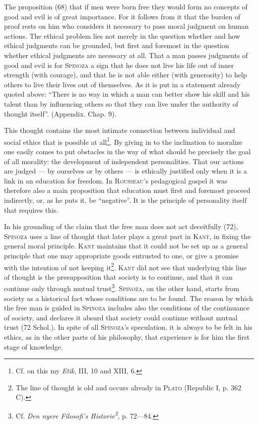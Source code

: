 \documentclass[12pt]{article}
\newcommand{\opage}[1]{\marginnote{\footnotesize\textit{[#1]}}}
\begin{document}
The proposition (68) that if men were born free they would form no concepts of good and evil is of
great importance. For it follows from it that the burden of proof rests on him who considers it
necessary to pass moral judgment on human actions. The ethical problem lies not merely in the
question whether and how ethical judgments can be grounded, but first and foremost in the question
whether ethical judgments are necessary at all. That a man passes judgments of good and evil is for
\textsc{Spinoza} a sign that he does not live his life out of inner strength (with courage), and
that he is not able either (with generosity) to help others to live their lives out of themselves.
As it is put in a statement already quoted above: ``There is no way in which a man can better show
his skill and his talent than by influencing others so that they can live under the authority of
thought itself''. (Appendix. Chap. 9).

This thought contains the most intimate connection between individual and social ethics that is
possible at all\footnote{Cf. on this my \textit{Etik}, III, 10 and XIII, 6.}. By giving in to the
inclination to moralize one easily comes to put obstacles in the way of what should be precisely
\opage{83}the goal of all morality: the development of independent personalities. That our actions
are judged --- by ourselves or by others --- is ethically justified only when it is a link in an
education for freedom. In \textsc{Rousseau}'s pedagogical gospel it was therefore also a main
proposition that education must first and foremost proceed indirectly, or, as he puts it, be
``negative''. It is the principle of personality itself that requires this.

In his grounding of the claim that the free man does not act deceitfully (72), \textsc{Spinoza} uses
a line of thought that later plays a great part in \textsc{Kant}, in fixing the general moral
principle. \textsc{Kant} maintains that it could not be set up as a general principle that one may
appropriate goods entrusted to one, or give a promise with the intention of not keeping
it\footnote{The line of thought is old and occurs already in \textsc{Plato} (Republic I, p. 362
C).}. \textsc{Kant} did not see that underlying this line of thought is the presupposition that
society is to continue, and that it can continue only through mutual trust\footnote{Cf. \textit{Den
nyere Filosofi's Historie\textsuperscript{2}}, p. 72---84.}. \textsc{Spinoza}, on the other hand,
starts from society as a historical fact whose conditions are to be found. The reason by which the
free man is guided in \textsc{Spinoza} includes also the conditions of the continuance of society,
and declares it absurd that society could continue without mutual trust (72 Schol.). In spite of
all \textsc{Spinoza}'s speculation, it is always to be felt in his ethics, as in the other parts of
his philosophy, that experience is for him the first stage of knowledge.
\end{document}
